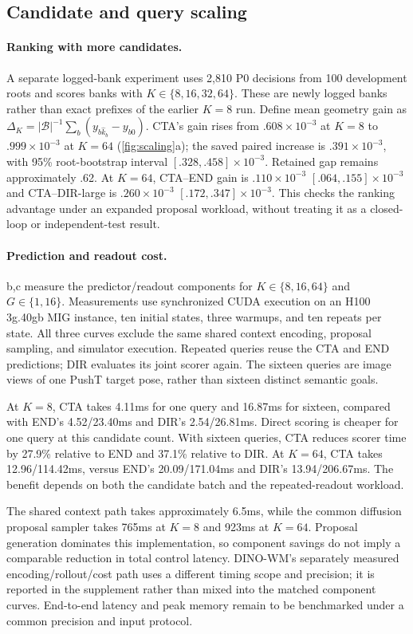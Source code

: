 \subsection{Candidate and query scaling}
\label{sec:compute}
\paragraph{Ranking with more candidates.}
A separate logged-bank experiment uses 2,810 P0 decisions from 100 development roots and scores banks with $K\in\{8,16,32,64\}$. These are newly logged banks rather than exact prefixes of the earlier $K=8$ run. Define mean geometry gain as $\Delta_K=|\mathcal B|^{-1}\sum_b(y_{b\hat k_b}-y_{b0})$. CTA's gain rises from $.608\times10^{-3}$ at $K=8$ to $.999\times10^{-3}$ at $K=64$ (\cref{fig:scaling}a); the saved paired increase is $.391\times10^{-3}$, with 95\% root-bootstrap interval $[.328,.458]\times10^{-3}$. Retained gap remains approximately .62. At $K=64$, CTA--END gain is $.110\times10^{-3}$ $[.064,.155]\times10^{-3}$ and CTA--DIR-large is $.260\times10^{-3}$ $[.172,.347]\times10^{-3}$. This checks the ranking advantage under an expanded proposal workload, without treating it as a closed-loop or independent-test result.

\paragraph{Prediction and readout cost.}
b,c measure the predictor/readout components for $K\in\{8,16,64\}$ and $G\in\{1,16\}$. Measurements use synchronized CUDA execution on an H100 3g.40gb MIG instance, ten initial states, three warmups, and ten repeats per state. All three curves exclude the same shared context encoding, proposal sampling, and simulator execution. Repeated queries reuse the CTA and END predictions; DIR evaluates its joint scorer again. The sixteen queries are image views of one PushT target pose, rather than sixteen distinct semantic goals.

At $K=8$, CTA takes 4.11ms for one query and 16.87ms for sixteen, compared with END's 4.52/23.40ms and DIR's 2.54/26.81ms. Direct scoring is cheaper for one query at this candidate count. With sixteen queries, CTA reduces scorer time by 27.9\% relative to END and 37.1\% relative to DIR. At $K=64$, CTA takes 12.96/114.42ms, versus END's 20.09/171.04ms and DIR's 13.94/206.67ms. The benefit depends on both the candidate batch and the repeated-readout workload.



The shared context path takes approximately 6.5ms, while the common diffusion proposal sampler takes 765ms at $K=8$ and 923ms at $K=64$. Proposal generation dominates this implementation, so component savings do not imply a comparable reduction in total control latency. DINO-WM's separately measured encoding/rollout/cost path uses a different timing scope and precision; it is reported in the supplement rather than mixed into the matched component curves. End-to-end latency and peak memory remain to be benchmarked under a common precision and input protocol.
